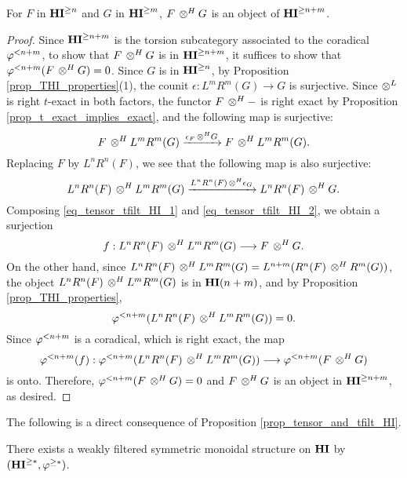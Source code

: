\begin{prop}\label{prop_tensor_and_tfilt_HI}
For $F$ in $\THI{n}$ and $G$ in $\THI{m}$, $F \tHI G$
is an object of $\THI{n + m}$.
\end{prop}
\begin{proof}
Since $\THI{n + m}$ is the torsion subcategory associated to the
coradical $\tlHI{n + m}$, to show that $F \tHI G$ is in 
$\THI{n + m}$, it suffices to show that $\tlHI{n + m}(F \tHI G) = 
0$. Since $G$ is in $\THI{n}$, by Proposition 
\ref{prop_THI_properties}(1), the counit $\epsilon: L^mR^m(G) \to 
G$ is surjective. Since $\tDM$ is right $t$-exact in both factors, 
the functor $F \tHI -$ is right exact by Proposition 
\ref{prop_t_exact_implies_exact}, and the following map is surjective:
\begin{equation}\label{eq_tensor_tfilt_HI_1}
F \tHI L^mR^m(G) \xrightarrow{\epsilon_F \tHI G} F \tHI L^mR^m(G).
\end{equation}
Replacing $F$ by $L^nR^n(F)$, we see that the following map is
also surjective:
\begin{equation}\label{eq_tensor_tfilt_HI_2}
L^nR^n(F) \tHI L^mR^m(G) \xrightarrow{L^nR^n(F) \tHI \epsilon_G}
L^nR^n(F) \tHI G.
\end{equation}
Composing \eqref{eq_tensor_tfilt_HI_1} and 
\eqref{eq_tensor_tfilt_HI_2}, we obtain a surjection
\[
f: L^nR^n(F) \tHI L^mR^m(G) \to F \tHI G.
\]
On the other hand, since $L^nR^n(F) \tHI L^mR^m(G) = 
L^{n + m}(R^n(F) \tHI R^m(G))$, the object $L^nR^n(F) \tHI L^mR^m(G)$
is in $\LHI[n + m]{\HI}$, and by Proposition
\ref{prop_THI_properties}, 
\[
\tlHI{n + m}(L^nR^n(F) \tHI L^mR^m(G)) = 0. 
\]
Since $\tlHI{n + m}$ is a coradical, which is right exact, the map
\[
\tlHI{n + m}(f) : \tlHI{n + m}(L^nR^n(F) \tHI L^mR^m(G)) \to
   \tlHI{n + m}(F \tHI G)
\]
is onto. Therefore, $\tlHI{n + m}(F \tHI G) = 0$ and 
$F \tHI G$ is an object in $\THI{n + m}$, as desired.
\end{proof}

The following is a direct consequence of Proposition 
\ref{prop_tensor_and_tfilt_HI}.

\begin{cor}\label{cor_graded_tensor_HI}
There exists a weakly filtered symmetric monoidal structure on $\HI$ by
$(\THI{*}, \tgHI{*})$.
\end{cor}
